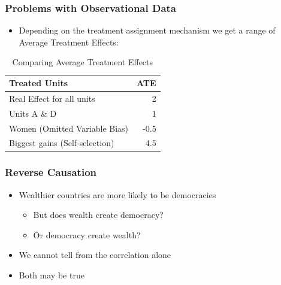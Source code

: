 \documentclass[xcolor=x11names,compress]{beamer}\usepackage[]{graphicx}\usepackage[]{color}
\renewcommand{\(}{\begin{columns}}
\renewcommand{\)}{\end{columns}}
\newcommand{\<}[1]{\begin{column}{#1}}
\renewcommand{\>}{\end{column}}
\begin{document}
\begin{frame}
\frametitle{Problems with Observational Data}
\begin{itemize}
\item Depending on the treatment assignment mechanism we get a range of Average Treatment Effects:
\end{itemize}
\begin{table}[htbp]
  \centering
  \caption{Comparing Average Treatment Effects}
    \begin{tabular}{|l|r|}
    \hline
    \textbf{Treated Units} & \multicolumn{1}{l|}{\textbf{ATE}} \bigstrut\\
    \hline
    Real Effect for all units & 2 \bigstrut\\
    \hline
    Units A \& D & 1 \bigstrut\\
    \hline
    Women (Omitted Variable Bias) & -0.5 \bigstrut\\
    \hline
    Biggest gains (Self-selection) & 4.5 \bigstrut\\
    \hline
    \end{tabular}%
\end{table}%
\end{frame}

\begin{frame}
\frametitle{Reverse Causation}
\begin{itemize}
\item Wealthier countries are more likely to be democracies
\pause
\begin{itemize}
\item But does wealth create democracy?
\pause
\item Or democracy create wealth?
\pause
\end{itemize}
\item We cannot tell from the correlation alone
\pause
\item Both may be true
\end{itemize}
\end{frame}
\end{document}
